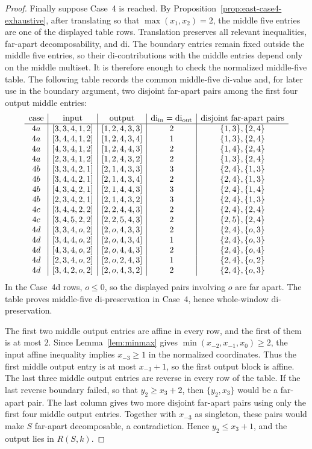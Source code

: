 \documentclass[11pt]{article}
\theoremstyle{plain}
\theoremstyle{definition}
\theoremstyle{remark}
\newcommand{\di}{\mathrm{di}}
\begin{document}
\begin{proof}
Finally suppose Case~4 is reached. By
Proposition~\ref{prop:east-case4-exhaustive}, after translating so that
\(\max(x_1,x_2)=2\), the middle five entries are one of the displayed table
rows. Translation preserves all relevant inequalities, far-apart
decomposability, and \(\di\). The boundary entries remain fixed outside the
middle five entries, so their \(\di\)-contributions with the middle entries
depend only on the middle multiset. It is therefore enough to check the
normalized middle-five table. The following table records the common
middle-five \(\di\)-value and, for later use in the boundary argument, two
disjoint far-apart pairs among the first four output middle entries:
\[
\begin{array}{c|c|c|c|c}
\text{case} & \text{input} & \text{output} & \di_{\rm in}=\di_{\rm out} &
\text{disjoint far-apart pairs}\\ \hline
4a &[3,3,4,1,2]&[1,2,4,3,3]&2&\{1,3\},\{2,4\}\\
4a &[3,4,4,1,2]&[1,2,4,3,4]&1&\{1,3\},\{2,4\}\\
4a &[4,3,4,1,2]&[1,2,4,4,3]&2&\{1,4\},\{2,4\}\\
4a &[2,3,4,1,2]&[1,2,4,3,2]&2&\{1,3\},\{2,4\}\\
4b &[3,3,4,2,1]&[2,1,4,3,3]&3&\{2,4\},\{1,3\}\\
4b &[3,4,4,2,1]&[2,1,4,3,4]&2&\{2,4\},\{1,3\}\\
4b &[4,3,4,2,1]&[2,1,4,4,3]&3&\{2,4\},\{1,4\}\\
4b &[2,3,4,2,1]&[2,1,4,3,2]&3&\{2,4\},\{1,3\}\\
4c &[3,4,4,2,2]&[2,2,4,4,3]&2&\{2,4\},\{2,4\}\\
4c &[3,4,5,2,2]&[2,2,5,4,3]&2&\{2,5\},\{2,4\}\\
4d &[3,3,4,o,2]&[2,o,4,3,3]&2&\{2,4\},\{o,3\}\\
4d &[3,4,4,o,2]&[2,o,4,3,4]&1&\{2,4\},\{o,3\}\\
4d &[4,3,4,o,2]&[2,o,4,4,3]&2&\{2,4\},\{o,4\}\\
4d &[2,3,4,o,2]&[2,o,2,4,3]&1&\{2,4\},\{o,2\}\\
4d &[3,4,2,o,2]&[2,o,4,3,2]&2&\{2,4\},\{o,3\}
\end{array}
\]
In the Case~4d rows, \(o\le 0\), so the displayed pairs involving
\(o\) are far apart. The table proves middle-five \(\di\)-preservation in
Case~4, hence whole-window \(\di\)-preservation.

The first two middle output entries are affine in every row, and the first of
them is at most \(2\). Since Lemma~\ref{lem:minmax} gives
\(\min(x_{-2},x_{-1},x_0)\ge 2\), the input affine inequality implies
\(x_{-3}\ge 1\) in the normalized coordinates. Thus the first middle output
entry is at most \(x_{-3}+1\), so the first output block is affine. The last
three middle output entries are reverse in every row of the table. If the last
reverse boundary failed, so that \(y_2\ge x_3+2\), then \(\{y_2,x_3\}\)
would be a far-apart pair. The last column gives two more disjoint
far-apart pairs using only the first four middle output entries. Together with
\(x_{-3}\) as singleton, these pairs would make \(S\) far-apart decomposable,
a contradiction. Hence \(y_2\le x_3+1\), and the output lies in \(R(S,k)\).


\end{proof}
\end{document}
